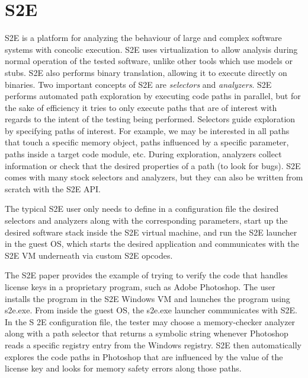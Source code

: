 \documentclass[11pt]{article}
\begin{document}
\section{S2E}
S2E is a platform for analyzing the behaviour of large and complex software
systems with concolic execution. S2E uses virtualization to allow
analysis during normal operation of the tested software, unlike other tools
which use models or stubs. S2E also performs binary translation, allowing it to
execute directly on binaries. Two important concepts of S2E
are \textit{selectors} and \textit{analyzers}. S2E performs automated path exploration by executing
code paths in parallel, but for the sake of efficiency it tries to only execute
paths that are of interest with regards to the intent of the testing being
performed. Selectors guide exploration by specifying paths of interest. For
example, we may be interested in all paths that touch a specific memory object,
paths influenced by a specific parameter, paths inside a target code module,
etc. During exploration, analyzers collect information or check that the desired
properties of a path (to look for bugs). S2E comes with many stock selectors and
analyzers, but they can also be written from scratch with the S2E API. \par
The typical S2E user only needs to define in a configuration file the desired
selectors and analyzers along with the corresponding parameters, start up the
desired software stack inside the S2E virtual machine, and run the S2E launcher
in the guest OS, which starts the desired application and communicates with the
S2E VM underneath via custom S2E opcodes. \par
The S2E paper provides the example of trying to verify the code that handles
license keys in a proprietary program, such as Adobe Photoshop. The user
installs the program in the S2E Windows VM and launches the program using
s2e.exe. From inside the guest OS, the s2e.exe
launcher communicates with S2E. In the S
2E configuration file, the tester may choose a memory-checker analyzer along
with a path selector that returns a symbolic string whenever Photoshop reads
a specific registry entry from the Windows registry. S2E
then automatically explores the code paths in Photoshop that are influenced by
the value of the license key and looks for memory safety errors along those 
paths. \par
\end{document}
